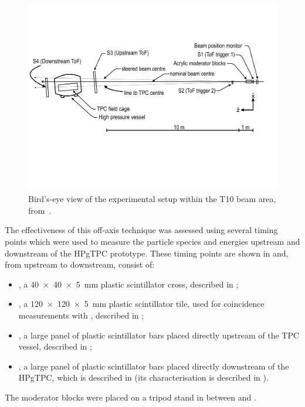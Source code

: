 \begin{figure}[h]
  \centering
  \includegraphics[width=\linewidth]{files/figures/hptpc_beam_flux/hptpc_t10_planview}
  \caption[Bird's-eye view of the experimental setup within the T10 beam area]{Bird's-eye view of the experimental setup within the T10 beam area, from~\cite{beampaper}.}
  \label{fig:beamSetup}
\end{figure}

The effectiveness of this off-axis technique was assessed using several timing points which were used to measure the particle species and energies upstream and downstream of the HPgTPC prototype.
These timing points are shown in  and, from upstream to downstream, consist of:
\begin{itemize}
    \item \SOne, a \SI{40 x 40 x 5}{\mm} plastic scintillator cross, described in ;
    \item \STwo, a \SI{120 x 120 x 5}{\mm} plastic scintillator tile, used for coincidence measurements with \SOne, described in ;
    \item \SThree, a large panel of plastic scintillator bars placed directly upstream of the TPC vessel, described in ;
    \item \SFour, a large panel of plastic scintillator bars placed directly downstream of the HPgTPC, which is described in  (its characterisation is described in ).
\end{itemize}
The moderator blocks were placed on a tripod stand in between \SOne and \STwo.

